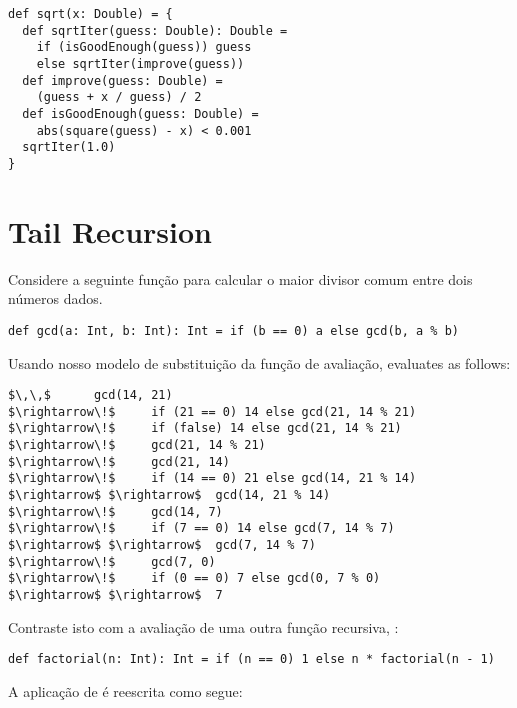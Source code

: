 \begin{lstlisting}
def sqrt(x: Double) = {
  def sqrtIter(guess: Double): Double =
    if (isGoodEnough(guess)) guess
    else sqrtIter(improve(guess))
  def improve(guess: Double) =
    (guess + x / guess) / 2
  def isGoodEnough(guess: Double) =
    abs(square(guess) - x) < 0.001
  sqrtIter(1.0)
}
\end{lstlisting}


\section{Tail Recursion}

Considere a seguinte fun\c{c}\~{a}o para calcular o maior divisor comum entre
dois n\'{u}meros dados.

\begin{lstlisting}
def gcd(a: Int, b: Int): Int = if (b == 0) a else gcd(b, a % b)
\end{lstlisting}

Usando nosso modelo de substitui\c{c}\~{a}o da fun\c{c}\~{a}o de avalia\c{c}\~{a}o,
 evaluates as follows:

\begin{lstlisting}
$\,\,$      gcd(14, 21)  
$\rightarrow\!$     if (21 == 0) 14 else gcd(21, 14 % 21)
$\rightarrow\!$     if (false) 14 else gcd(21, 14 % 21)
$\rightarrow\!$     gcd(21, 14 % 21)
$\rightarrow\!$     gcd(21, 14)
$\rightarrow\!$     if (14 == 0) 21 else gcd(14, 21 % 14)
$\rightarrow$ $\rightarrow$  gcd(14, 21 % 14)
$\rightarrow\!$     gcd(14, 7)
$\rightarrow\!$     if (7 == 0) 14 else gcd(7, 14 % 7)
$\rightarrow$ $\rightarrow$  gcd(7, 14 % 7)
$\rightarrow\!$     gcd(7, 0)
$\rightarrow\!$     if (0 == 0) 7 else gcd(0, 7 % 0)
$\rightarrow$ $\rightarrow$  7
\end{lstlisting}

Contraste isto com a avalia\c{c}\~{a}o de uma outra fun\c{c}\~{a}o recursiva,
:

\begin{lstlisting}
def factorial(n: Int): Int = if (n == 0) 1 else n * factorial(n - 1)
\end{lstlisting}

A aplica\c{c}\~{a}o de  \'{e} reescrita como segue: 


